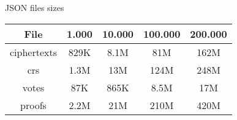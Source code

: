 \documentclass{standalone}
\begin{document}
\begin{threeparttable}
\caption{JSON files sizes}
\label{table:files}
\begin{tabular}{ |c||c|c|c|c| }
\hline
\textbf{File} & \textbf{1.000} & \textbf{10.000} & \textbf{100.000} & \textbf{200.000} \\
\hline
ciphertexts & 829K & 8.1M & 81M & 162M \\
crs & 1.3M & 13M & 124M & 248M \\
votes & 87K & 865K & 8.5M & 17M \\
proofs & 2.2M & 21M & 210M & 420M \\
\hline
\end{tabular}
\begin{tablenotes}
\small
\item
\end{tablenotes}
\end{threeparttable}
\end{document}
